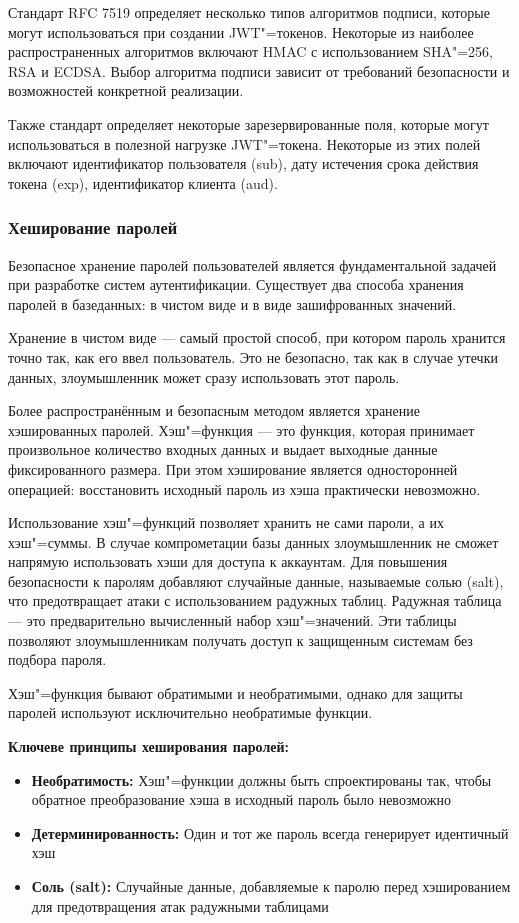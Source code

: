 Стандарт RFC 7519 определяет несколько типов алгоритмов подписи, которые могут использоваться при создании JWT"=токенов. Некоторые из наиболее распространенных алгоритмов включают HMAC с использованием SHA"=256, RSA и ECDSA. Выбор алгоритма подписи зависит от требований безопасности и возможностей конкретной реализации.

Также стандарт определяет некоторые зарезервированные поля, которые могут использоваться в полезной нагрузке JWT"=токена. Некоторые из этих полей включают идентификатор пользователя (sub), дату истечения срока действия токена (exp), идентификатор клиента (aud).

\subsubsection{Хеширование паролей}

Безопасное хранение паролей пользователей является фундаментальной задачей при разработке систем аутентификации. Существует два способа хранения паролей в базеданных: в чистом виде и в виде зашифрованных значений. 

Хранение в чистом виде --- самый простой способ, при котором пароль хранится точно так, как его ввел пользователь. Это не безопасно, так как в случае утечки данных, злоумышленник может сразу использовать этот пароль.

Более распространённым и безопасным методом является хранение хэшированных паролей. Хэш"=функция --- это функция, которая принимает произвольное количество входных данных и выдает выходные данные фиксированного размера. При этом хэширование является односторонней операцией: восстановить исходный пароль из хэша практически невозможно.\cite{hashing1}

Использование хэш"=функций позволяет хранить не сами пароли, а их хэш"=суммы. В случае компрометации базы данных злоумышленник не сможет напрямую использовать хэши для доступа к аккаунтам. Для повышения безопасности к паролям добавляют случайные данные, называемые солью (salt), что предотвращает атаки с использованием радужных таблиц. Радужная таблица --- это предварительно вычисленный набор хэш"=значений. Эти таблицы позволяют злоумышленникам получать доступ к защищенным системам без подбора пароля. \cite{hashing2}

 Хэш"=функция бывают обратимыми и необратимыми, однако для защиты паролей используют исключительно необратимые функции.

\textbf{Ключеве принципы хеширования паролей:}
\begin{itemize}
	\item{\textbf{Необратимость:} Хэш"=функции должны быть спроектированы так, чтобы обратное преобразование хэша в исходный пароль было невозможно}	
	\item{\textbf{Детерминированность:} Один и тот же пароль всегда генерирует идентичный хэш}
	\item{\textbf{ Соль (salt):} Случайные данные, добавляемые к паролю перед хэшированием для предотвращения атак радужными таблицами}
\end{itemize}
